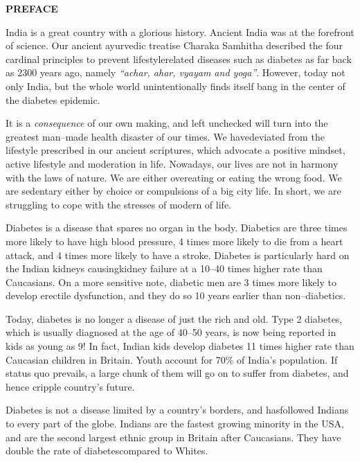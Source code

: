 \thispagestyle{empty}


\begin{center}
\Huge\textbf{PREFACE}
\end{center}

\vskip 20pt

India is a great country with a glorious history. Ancient India was at the forefront of science. Our ancient ayurvedic treatise Charaka Samhitha described the four cardinal principles to prevent lifestyle\break related diseases such as diabetes as far back as 2300 years ago, namely \textit{“achar, ahar, vyayam and yoga”}. However, today not only India, but the whole world unintentionally finds itself bang in the center of the diabetes epidemic.

It is a \textit{consequence} of our own making, and left unchecked will turn into the greatest man–made health disaster of our times. We have\break deviated from the lifestyle prescribed in our ancient scriptures, which advocate a positive mindset, active lifestyle and moderation in life. Nowadays, our lives are not in harmony with the laws of nature. We are either overeating or eating the wrong food. We are sedentary either by choice or compulsions of a big city life. In short, we are struggling to cope with the stresses of modern of life.

Diabetes is a disease that spares no organ in the body. Diabetics are three times more likely to have high blood pressure, 4 times more likely to die from a heart attack, and 4 times more likely to have a stroke. Diabetes is particularly hard on the Indian kidneys causing\break kidney failure at a 10–40 times higher rate than Caucasians. On a more sensitive note, diabetic men are 3 times more likely to develop erectile dysfunction, and they do so 10 years earlier than non–diabetics.

Today, diabetes is no longer a disease of just the rich and old. Type 2 diabetes, which is usually diagnosed at the age of 40–50 years, is now being reported in kids as young as 9! In fact, Indian kids develop diabetes 11 times higher rate than Caucasian children in Britain. Youth account for 70\% of India’s population. If status quo prevails, a large chunk of them will go on to suffer from diabetes, and hence cripple country’s future.

Diabetes is not a disease limited by a country’s borders, and has\break followed Indians to every part of the globe. Indians are the fastest growing minority in the USA, and are the second largest ethnic group in Britain after Caucasians. They have double the rate of diabetes\break compared to Whites.

